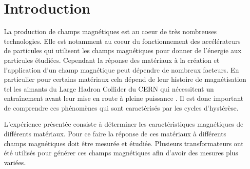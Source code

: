 \section{Introduction}

La production de champs magnétiques est au coeur de très nombreuses technologies. Elle est notamment au coeur du fonctionnement des accélérateurs de particules qui utilisent les champs magnétiques pour donner de l'énergie aux particules étudiées. Cependant la réponse des matériaux à la création et l'application d'un champ magnétique peut dépendre de nombreux facteurs. En particulier pour certains matériaux cela dépend de leur histoire de magnétisation tel les aimants du Large Hadron Collider du CERN qui nécessitent un entraînement avant leur mise en route à pleine puissance \cite{CERN_aimants}. Il est donc important de comprendre ces phénomènes qui sont caractérisés par les cycles d'hystérèse.

L'expérience présentée consiste à déterminer les caractéristiques magnétiques de différents matériaux. Pour ce faire la réponse de ces matériaux à différents champs magnétiques doit être mesurée et étudiée. Plusieurs transformateurs ont été utilisés pour générer ces champs magnétiques afin d'avoir des mesures plus variées.